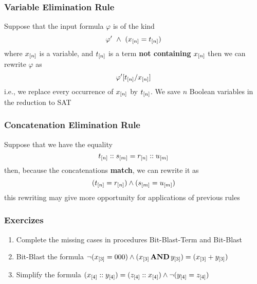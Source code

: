 \begin{frame}
  \frametitle{Variable Elimination Rule}

  Suppose that the input formula $\varphi$ is of the kind
  \vfill
  $$
  \varphi'\ \wedge\ (x_{[n]} = t_{[n]})
  $$
  \vfill
  where $x_{[n]}$ is a variable, and $t_{[n]}$ is a term {\bf not containing} $x_{[n]}$
  \pause
  \vfill
  then we can rewrite $\varphi$ as
  $$
  \varphi'[t_{[n]}/x_{[n]}]
  $$
  \vfill
  i.e., we replace every occurrence of $x_{[n]}$ by $t_{[n]}$. \pause We save $n$
  Boolean variables in the reduction to SAT

\end{frame}

\begin{frame}
  \frametitle{Concatenation Elimination Rule}

  Suppose that we have the equality
  \vfill
  $$
  t_{[n]} :: s_{[m]} = r_{[n]} :: u_{[m]}
  $$
  \vfill
  then, because the concatenations {\bf match}, we can rewrite it as
  \pause
  \vfill
  $$
  (t_{[n]} = r_{[n]}) \wedge (s_{[m]} = u_{[m]}) 
  $$
  \vfill
  this rewriting may give more opportunity for applications of previous rules

\end{frame}

\begin{frame}
  \frametitle{Exercizes}

  \begin{enumerate}

    \item Complete the missing cases in procedures Bit-Blast-Term and Bit-Blast
    \vfill
    \item Bit-Blast the formula $\neg(x_{[3]} = 000) \wedge (x_{[3]} \,{\bf AND}\, y_{[3]}) = (x_{[3]} + y_{[3]})$ 
    \vfill
    \item Simplify the formula $(x_{[4]} :: y_{[4]}) = (z_{[4]} :: x_{[4]}) \wedge \neg( y_{[4]} = z_{[4]})$ 

  \end{enumerate}

\end{frame}
